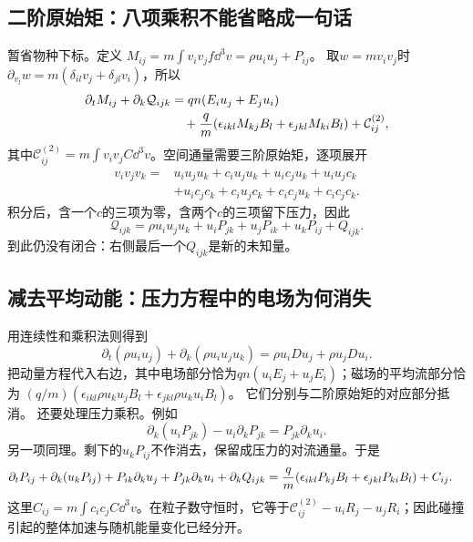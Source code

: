 \subsection{二阶原始矩：八项乘积不能省略成一句话}
暂省物种下标。定义
$M_{ij}=m\int v_iv_jf\dd^3v=\rho u_iu_j+P_{ij}$。
取$w=mv_iv_j$时
$\partial_{v_l}w=m(\delta_{il}v_j+\delta_{jl}v_i)$，所以
\begin{align}
 \partial_tM_{ij}+\partial_k\mathcal Q_{ijk}
 &=qn(E_iu_j+E_ju_i)\\
 &\quad+{q\over m}
 (\epsilon_{ikl}M_{kj}B_l+\epsilon_{jkl}M_{ki}B_l)
 +\mathcal C^{(2)}_{ij},\nonumber
\end{align}
其中$\mathcal C^{(2)}_{ij}=m\int v_iv_jC\dd^3v$。空间通量需要三阶原始矩，逐项展开
\begin{align}
 v_iv_jv_k={}&u_iu_ju_k
 +c_iu_ju_k+u_ic_ju_k+u_iu_jc_k\\
 &+u_ic_jc_k+c_iu_jc_k+c_ic_ju_k+c_ic_jc_k.\nonumber
\end{align}
积分后，含一个$c$的三项为零，含两个$c$的三项留下压力，因此
\begin{equation}
 \mathcal Q_{ijk}
 =\rho u_iu_ju_k+u_iP_{jk}+u_jP_{ik}+u_kP_{ij}+Q_{ijk}.
 \label{eq:tutorial-rawthird}
\end{equation}
到此仍没有闭合：右侧最后一个$Q_{ijk}$是新的未知量。

\subsection{减去平均动能：压力方程中的电场为何消失}
用连续性和乘积法则得到
\begin{equation}
 \partial_t(\rho u_iu_j)+\partial_k(\rho u_iu_ju_k)
 =\rho u_iDu_j+\rho u_jDu_i.
\end{equation}
把动量方程代入右边，其中电场部分恰为$qn(u_iE_j+u_jE_i)$；磁场的平均流部分恰为
$(q/m)(\epsilon_{ikl}\rho u_ku_jB_l+\epsilon_{jkl}\rho u_ku_iB_l)$。
它们分别与二阶原始矩的对应部分抵消。
还要处理压力乘积。例如
\begin{equation}
 \partial_k(u_iP_{jk})-u_i\partial_kP_{jk}
 =P_{jk}\partial_ku_i.
\end{equation}
另一项同理。剩下的$u_kP_{ij}$不作消去，保留成压力的对流通量。于是
\begin{align}
 \partial_tP_{ij}+\partial_k(u_kP_{ij})
 +P_{ik}\partial_ku_j+P_{jk}\partial_ku_i+\partial_kQ_{ijk}
 ={}&{q\over m}(\epsilon_{ikl}P_{kj}B_l+\epsilon_{jkl}P_{ki}B_l)
 +C_{ij}.
 \label{eq:pressure}
\end{align}
这里$C_{ij}=m\int c_ic_jC\dd^3v$。在粒子数守恒时，它等于$\mathcal C^{(2)}_{ij}-u_iR_j-u_jR_i$；因此碰撞引起的整体加速与随机能量变化已经分开。

